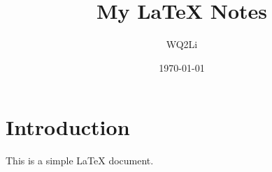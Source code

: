 \documentclass{article}
\begin{document}
\title{My LaTeX Notes}
\author{WQ2Li}
\date{\today}
\maketitle

\section{Introduction}
This is a simple LaTeX document.
\end{document}
